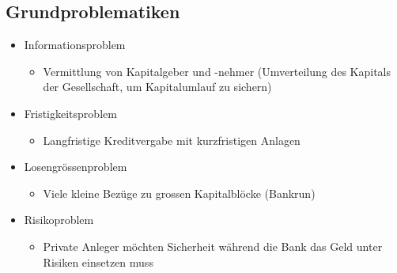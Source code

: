 \subsection{Grundproblematiken}
\begin{itemize}
    \item Informationsproblem
    \begin{itemize}
        \item Vermittlung von Kapitalgeber und -nehmer (Umverteilung des Kapitals der Gesellschaft, um Kapitalumlauf zu sichern)
    \end{itemize}
    \item Fristigkeitsproblem
    \begin{itemize}
        \item Langfristige Kreditvergabe mit kurzfristigen Anlagen
    \end{itemize}
    \item Losengrössenproblem
    \begin{itemize}
        \item Viele kleine Bezüge zu grossen Kapitalblöcke (Bankrun)
    \end{itemize}
    \item Risikoproblem
    \begin{itemize}
        \item Private Anleger möchten Sicherheit während die Bank das Geld unter Risiken einsetzen muss 
    \end{itemize}
\end{itemize}

